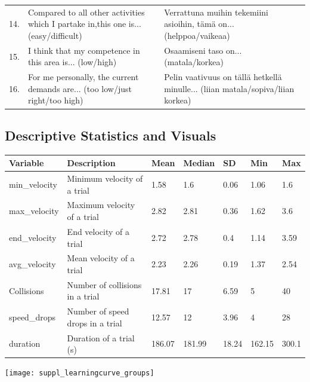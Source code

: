 \documentclass[a4paper,doc,floatsintext,natbib,10pt]{apa6}
\begin{document}
\begin{minipage}{\textwidth}
\begin{tabular}{l p{} p{}}
\\
14. & Compared to all other activities which I partake in,this one is... (easy/difficult) & Verrattuna muihin tekemiini asioihin, t\"{a}m\"{a} on... (helppoa/vaikeaa) \\
15. & I think that my competence in this area is... (low/high)  & Osaamiseni taso on... (matala/korkea)\\
16. & For me personally, the current demands are... (too low/just right/too high) & Pelin vaativuus on t\"{a}ll\"{a} hetkell\"{a} minulle... (liian matala/sopiva/liian korkea)\\
\end{tabular}
\end{minipage}


\subsection*{Descriptive Statistics and Visuals}

\begin{minipage}{\textwidth}
\centering
{}
\begin{tabular}{lllllll}
\hline
Variable & Description & Mean & Median & SD & Min & Max \\
\hline
min\_velocity & Minimum velocity of a trial & 1.58 & 1.6 & 0.06 & 1.06 & 1.6 \\
max\_velocity & Maximum velocity of a trial & 2.82 & 2.81 & 0.36 & 1.62 & 3.6 \\
end\_velocity & End velocity of a trial & 2.72 & 2.78 & 0.4 & 1.14 & 3.59 \\
avg\_velocity & Mean velocity of a trial & 2.23 & 2.26 & 0.19 & 1.37 & 2.54 \\
Collisions & Number of collisions in a trial & 17.81 & 17 & 6.59 & 5 & 40 \\
speed\_drops & Number of speed drops in a trial & 12.57 & 12 & 3.96 & 4 & 28 \\
duration & Duration of a trial (s) & 186.07 & 181.99 & 18.24 & 162.15 & 300.1 \\
\hline
\end{tabular}
\end{minipage}

\noindent
\begin{minipage}{\textwidth}
\centering
\texttt{[image: suppl\_learningcurve\_groups]}
\label{fig:supp_LC_groups}
\end{minipage}%
\end{document}
